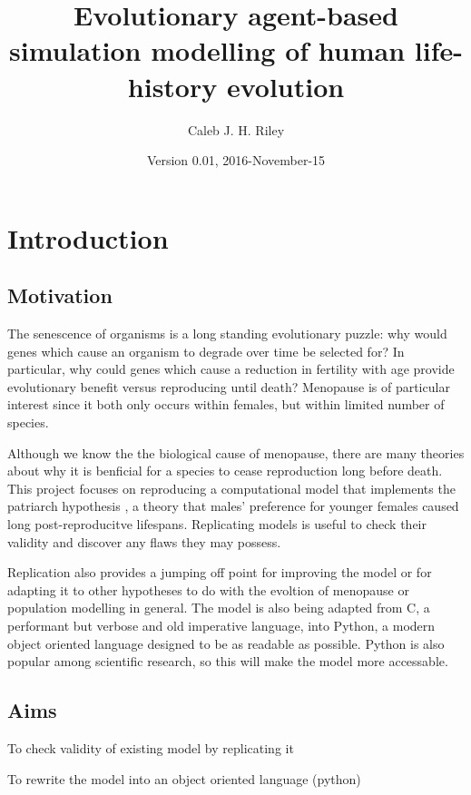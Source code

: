 \documentclass[authoryearcitations]{UoYCSproject}
\author{Caleb J. H. Riley}
\title{Evolutionary agent-based simulation modelling of human life-history evolution}
\date{Version 0.01, 2016-November-15}
\begin{document}
\maketitle
\listoffigures
\listoftables

\cleardoublepage

\chapter{Introduction}
\label{cha:Introduction}
\section{Motivation}
The senescence of organisms is a long standing evolutionary puzzle: why would genes which cause an organism to degrade over time be selected for? In particular, why could genes which cause a reduction in fertility with age provide evolutionary benefit versus reproducing until death? Menopause is of particular interest since it both only occurs within females, but within limited number of species.

Although we know the the biological cause of menopause, there are many theories about why it is benficial for a species to cease reproduction long before death. This project focuses on reproducing a computational model \cite{mateChoice2013} that implements the patriarch hypothesis \cite{patriarchHypothesis2000}, a theory that males' preference for younger females caused long post-reproducitve lifespans. Replicating models is useful to check their validity and discover any flaws they may possess. 

Replication also provides a jumping off point for improving the model or for adapting it to other hypotheses to do with the evoltion of menopause or population modelling in general. The model is also being adapted from C, a performant but verbose and old imperative language, into Python, a modern object oriented language designed to be as readable as possible. Python is also popular among scientific research, so this will make the model more accessable.

\section{Aims}
To check validity of existing model by replicating it

To rewrite the model into an object oriented language (python)
\end{document}

